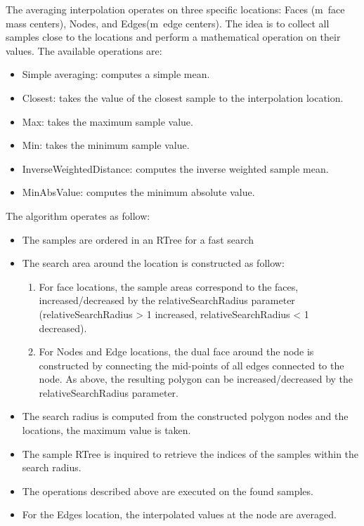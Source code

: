 \documentclass[biblatex]{deltares_manual}
\begin{document}
The averaging interpolation operates on three specific locations: Faces (m\ face mass centers), Nodes, and Edges(m\ edge centers). The idea is to collect all samples close to the locations and perform a mathematical operation on their values. The available operations are:
\begin{itemize}
	\item Simple averaging: computes a simple mean.
	\item Closest: takes the value of the closest sample to the interpolation location.
	\item Max: takes the maximum sample value.
	\item Min: takes the minimum sample value.
	\item InverseWeightedDistance: computes the inverse weighted sample mean.
	\item MinAbsValue: computes the minimum absolute value.
\end{itemize}
The algorithm operates as follow:
\begin{itemize}
	\item The samples are ordered in an RTree for a fast search
	\item The search area around the location is constructed as follow:
\begin{enumerate}
		\item For face locations, the sample areas correspond to the faces, increased/decreased by the relativeSearchRadius parameter (relativeSearchRadius  > 1 increased, relativeSearchRadius < 1 decreased).
		\item For Nodes and Edge locations, the dual face around the node is constructed by connecting the mid-points of all edges connected to the node. As above, the resulting polygon can be increased/decreased by the relativeSearchRadius parameter.
\end{enumerate}
\item The search radius is computed from the constructed polygon nodes and the locations, the maximum value is taken.
\item The sample RTree is inquired to retrieve the indices of the samples within the search radius.
\item The operations described above are executed on the found samples.
\item For the Edges location, the interpolated values at the node are averaged.

\end{itemize}
\end{document}
